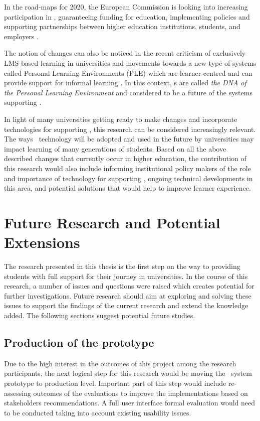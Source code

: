 In the road-maps for 2020, the European Commission is looking into increasing
participation in \LLLsn, guaranteeing funding for education, implementing \LLLs
policies and supporting partnerships between higher education institutions,
students, and employers \citep{EuropeanCommission2010,EuropeanUnion2009}.

The notion of changes can also be noticed in the recent criticism of exclusively
LMS-based learning in universities and movements towards a new type of systems
called Personal Learning Environments (PLE) which are learner-centred and can
provide support for informal learning \citep{Calvani2007}. In this context, \ep
s are called \textit{the DNA of the Personal Learning Environment} and
considered to be a future of the systems supporting \LLLs \citet{Attwell2007a}.

In light of many universities getting ready to make changes and incorporate
technologies for supporting \LLLsn, this research can be considered increasingly
relevant. The ways \ep~technology will be adopted and used in the future by
universities may impact learning of many generations of students. Based on all
the above described changes that currently occur in higher education, the
contribution of this research would also include informing institutional policy
makers of the role and importance of technology for supporting \LLLsn, ongoing
technical developments in this area, and potential solutions that would help to
improve learner experience.

\section{Future Research and Potential Extensions}
The research presented in this thesis is the first step on the way to providing
students with full support for their \LLLs journey in universities. In the
course of this research, a number of issues and questions were raised which
creates potential for further investigations. Future research should aim at
exploring and solving these issues to support the findings of the current
research and extend the knowledge added. The following sections suggest
potential future studies.

\subsection{Production of the prototype}
Due to the high interest in the outcomes of this project among the research
participants, the next logical step for this research would be moving the
\ep~system prototype to production level. Important part of this step would
include re-assessing outcomes of the evaluations to improve the implementations
based on stakeholders recommendations. A full user interface formal evaluation
would need to be conducted taking into account existing usability issues.

